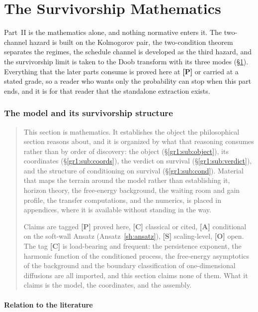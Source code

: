 \documentclass[11pt]{article}
\numberwithin{equation}{section}
\theoremstyle{plain}
\theoremstyle{definition}
\theoremstyle{remark}
\begin{document}
\part{The Survivorship Mathematics}

\noindent Part~II is the mathematics alone, and nothing normative
enters it. The two-channel hazard is built on the Kolmogorov pair,
the two-condition theorem separates the regimes, the schedule channel
is developed as the third hazard, and the survivorship limit is taken
to the Doob transform with its three modes (\S\ref{gr1:sec}).
Everything that the later parts consume is proved here at
\textbf{[P]} or carried at a stated grade, so a reader who wants only
the probability can stop when this part ends, and it is for that
reader that the standalone extraction exists.

\section{The model and its survivorship structure}\label{gr1:sec}

\begin{quote}\small
This section is mathematics. It establishes the object the philosophical
section reasons about, and it is organized by what that reasoning
consumes rather than by order of discovery: the object
(\S\ref{gr1:sub:object}), its coordinates (\S\ref{gr1:sub:coords}), the
verdict on survival (\S\ref{gr1:sub:verdict}), and the structure of
conditioning on survival (\S\ref{gr1:sub:cond}). Material that maps the
terrain around the model rather than establishing it, horizon theory,
the free-energy background, the waiting room and gain profile, the
transfer computations, and the numerics, is placed in appendices,
where it is available without standing in the way.

Claims are tagged \textbf{[P]} proved here, \textbf{[C]} classical or
cited, \textbf{[A]} conditional on the soft-wall Ansatz
(Ansatz~\ref{sh:ansatz}), \textbf{[S]} scaling-level, \textbf{[O]}
open. The tag \textbf{[C]} is load-bearing and frequent: the persistence
exponent, the harmonic function of the conditioned process, the
free-energy asymptotics of the background and the boundary
classification of one-dimensional diffusions are all imported, and this
section claims none of them. What it claims is the model, the
coordinates, and the assembly.
\end{quote}

\subsection{Relation to the literature}\label{gr1:sub:literature}
\end{document}
